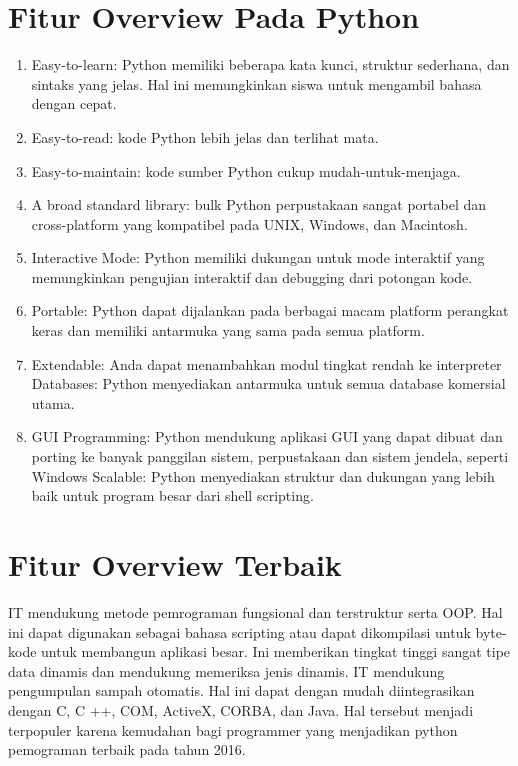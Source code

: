 \section{Fitur Overview Pada Python}

\begin{enumerate}
\item Easy-to-learn: Python memiliki beberapa kata kunci, struktur sederhana, dan sintaks yang jelas. $  $Hal ini memungkinkan siswa untuk mengambil bahasa dengan cepat. 
\item Easy-to-read: kode Python lebih jelas dan terlihat mata. 
\item Easy-to-maintain: kode sumber Python cukup mudah-untuk-menjaga.
\item A broad standard library: bulk Python perpustakaan sangat portabel dan cross-platform yang kompatibel pada UNIX, Windows, dan Macintosh. 
\item Interactive Mode: Python memiliki dukungan untuk mode interaktif yang memungkinkan pengujian interaktif dan debugging dari potongan kode. 
\item Portable: Python dapat dijalankan pada berbagai macam platform perangkat keras dan memiliki antarmuka yang sama pada semua platform.
\item Extendable: Anda dapat menambahkan modul tingkat rendah ke interpreter Databases: Python menyediakan antarmuka untuk semua database komersial utama. 
\item GUI Programming: Python mendukung aplikasi GUI yang dapat dibuat dan porting ke banyak panggilan sistem, perpustakaan dan sistem jendela, seperti Windows Scalable: Python menyediakan struktur dan dukungan yang lebih baik untuk program besar dari shell scripting. 
\end{enumerate}

\section{Fitur Overview Terbaik} 
IT mendukung metode pemrograman fungsional dan terstruktur serta OOP. Hal ini dapat digunakan sebagai bahasa scripting atau dapat dikompilasi untuk byte-kode untuk membangun aplikasi besar. Ini memberikan tingkat tinggi sangat tipe data dinamis dan mendukung memeriksa jenis dinamis. IT mendukung pengumpulan sampah otomatis. Hal ini dapat dengan mudah diintegrasikan dengan C, C ++, COM, ActiveX, CORBA, dan Java. Hal tersebut menjadi terpopuler karena kemudahan bagi programmer yang menjadikan python pemograman terbaik pada tahun 2016.

